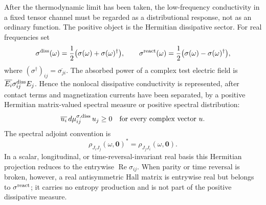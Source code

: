 After the thermodynamic limit has been taken, the low-frequency conductivity
in a fixed tensor channel must be regarded as a distributional response, not
as an ordinary function.  The positive object is the Hermitian dissipative
sector.  For real frequencies set
\[
  \sigma^{\rm diss}(\omega)
  =
  \frac12\bigl(\sigma(\omega)+\sigma(\omega)^\dagger\bigr),
  \qquad
  \sigma^{\rm react}(\omega)
  =
  \frac12\bigl(\sigma(\omega)-\sigma(\omega)^\dagger\bigr),
\]
where \((\sigma^\dagger)_{ij}=\overline{\sigma_{ji}}\).  The absorbed power
of a complex test electric field is
\(\overline{E_i}\sigma^{\rm diss}_{ij}E_j\).  Hence the nonlocal
dissipative conductivity is represented, after contact terms and
magnetization currents have been separated, by a positive Hermitian
matrix-valued spectral measure or positive spectral distribution:
\[
  \overline{u_i}\,d\mu^{\sigma,\rm diss}_{ij}\,u_j\ge0
  \quad\text{for every complex vector }u .
\]
The spectral adjoint convention is
\[
  \rho_{J_iJ_j}(\omega,\mathbf0)^*
  =
  \rho_{J_jJ_i}(\omega,\mathbf0).
\]
In a scalar, longitudinal, or time-reversal-invariant real basis this
Hermitian projection reduces to the entrywise
\(\operatorname{Re}\sigma_{ij}\).  When parity or time reversal is broken,
however, a real antisymmetric Hall matrix is entrywise real but belongs to
\(\sigma^{\rm react}\); it carries no entropy production and is not part of
the positive dissipative measure.

